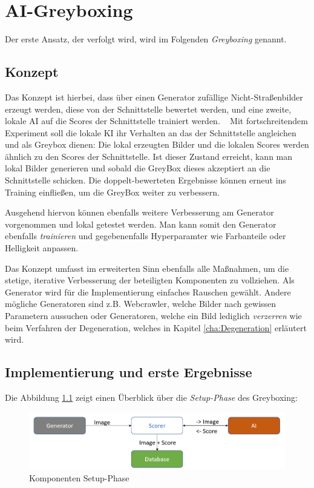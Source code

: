 \chapter{AI-Greyboxing}
\label{cha:GreyBoxing}
Der erste Ansatz, der verfolgt wird, wird im Folgenden \textit{Greyboxing} genannt.
\section{Konzept}
\label{sec:KonzeptGreyBoxing}
Das Konzept ist hierbei, dass über einen Generator zufällige Nicht-Straßenbilder erzeugt werden, diese von der Schnittstelle bewertet werden, und eine zweite, lokale AI auf die Scores der Schnittstelle trainiert werden. 
~\newline
Mit fortschreitendem Experiment soll die lokale \ac{KI} ihr Verhalten an das der Schnittstelle angleichen und als Greybox dienen: Die lokal erzeugten Bilder und die lokalen Scores werden ähnlich zu den Scores der Schnittstelle. Ist dieser Zustand erreicht, kann man lokal Bilder generieren und sobald die GreyBox dieses akzeptiert an die Schnittstelle schicken. Die doppelt-bewerteten Ergebnisse können erneut ins Training einfließen, um die GreyBox weiter zu verbessern. 

Ausgehend hiervon können ebenfalls weitere Verbesserung am Generator vorgenommen und lokal getestet werden.
Man kann somit den Generator ebenfalls \textit{trainieren} und gegebenenfalls Hyperparamter wie Farbanteile oder Helligkeit anpassen. 

Das Konzept umfasst im erweiterten Sinn ebenfalls alle Maßnahmen, um die stetige, iterative Verbesserung der beteiligten Komponenten zu vollziehen. Als Generator wird für die Implementierung einfaches Rauschen gewählt. Andere mögliche Generatoren sind z.B. Webcrawler, welche Bilder nach gewissen Parametern aussuchen oder Generatoren, welche ein Bild lediglich \textit{verzerren} wie beim Verfahren der Degeneration, welches in Kapitel \ref{cha:Degeneration} erläutert wird. 

\section{Implementierung und erste Ergebnisse}\label{sec:ImplementierungGreyBoxing}

Die Abbildung \ref{fig:greyboxingstart} zeigt einen Überblick über die \textit{Setup-Phase} des Greyboxing:

\begin{figure}[h]
	\centering
	\includegraphics[width=0.9\linewidth]{Images/GreyBoxingStart}
	\caption[Komponenten Setup-Phase]{Komponenten Setup-Phase}
	\label{fig:greyboxingstart}
\end{figure}

